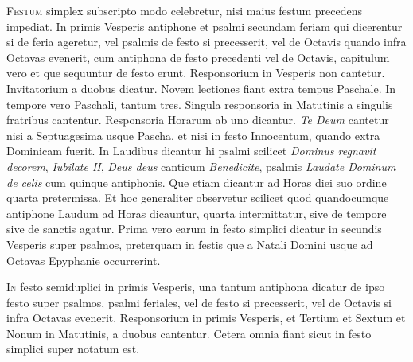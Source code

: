 \begin{multicols*}{2}
{\color{Red} }
\lettrine[lines=2]{\zallmancaps \color{Red} F}{estum} simplex subscripto modo celebretur, nisi maius festum precedens impediat. In primis Vesperis antiphone et psalmi secundam feriam qui dicerentur si de feria ageretur, vel psalmis de festo si precesserit, vel de Octavis quando infra Octavas evenerit, cum antiphona de festo precedenti vel de Octavis, capitulum vero et que sequuntur de festo erunt. Responsorium in Vesperis non cantetur. Invitatorium a duobus dicatur. Novem lectiones fiant extra tempus Paschale. In tempore vero Paschali, tantum tres. Singula responsoria in Matutinis a singulis fratribus cantentur. Responsoria Horarum ab uno dicantur. \textit{Te Deum} cantetur nisi a Septuagesima usque Pascha, et nisi in festo Innocentum, quando extra Dominicam fuerit. In Laudibus dicantur hi psalmi scilicet \textit{Dominus regnavit decorem}, \textit{Iubilate II}, \textit{Deus deus} canticum \textit{Benedicite}, psalmis \textit{Laudate Dominum de celis} cum quinque antiphonis. Que etiam dicantur ad Horas diei suo ordine quarta pretermissa. Et hoc generaliter observetur scilicet quod quandocumque antiphone Laudum ad Horas dicauntur, quarta intermittatur, sive de tempore sive de sanctis agatur.
Prima vero earum in festo simplici dicatur in secundis Vesperis super psalmos, preterquam in festis que a Natali Domini usque ad Octavas Epyphanie occurrerint.

{\color{Red} }
\lettrine[lines=2]{\zallmancaps \color{Blue} I}{n} festo semiduplici in primis Vesperis, una tantum antiphona dicatur de ipso festo super psalmos, psalmi feriales, vel de festo si precesserit, vel de Octavis si infra Octavas evenerit.
Responsorium in primis Vesperis, et Tertium et Sextum et Nonum in Matutinis, a duobus cantentur. Cetera omnia fiant sicut in festo simplici super notatum est.


\end{multicols*}

